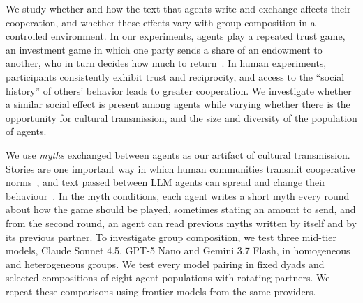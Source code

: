 We study whether and how the text that agents write and exchange affects their cooperation, and whether these effects vary with group composition in a controlled environment. %
In our experiments, agents play a repeated trust game, 
an investment game in which one party sends a share of an endowment to another, who in turn decides how much to return~\citep{berg1995}. 
In human experiments, participants consistently exhibit trust and reciprocity, and access to the ``social history'' of others' behavior leads to greater cooperation. 
We investigate whether a similar social effect is present among agents while varying whether there is the opportunity for cultural transmission, and the size and diversity of the population of agents.
%

We use \textit{myths} exchanged between agents as our artifact of cultural transmission. 
Stories are one important way in which human communities transmit cooperative norms~\citep{smith2017}, and text passed between LLM agents can spread and change their behaviour~\citep{papadopoulos2026}.
In the myth conditions, each agent writes a short myth every round about how the game should be played, sometimes stating an amount to send, and from the second round, an agent can read previous myths written by itself and by its previous partner. 
To investigate group composition, we test three mid-tier models, Claude Sonnet 4.5, GPT-5 Nano and Gemini 3.7 Flash, in homogeneous and heterogeneous groups.
We test every model pairing in fixed dyads and selected compositions of eight-agent populations with rotating partners. 
We repeat these comparisons using frontier models from the same providers.

